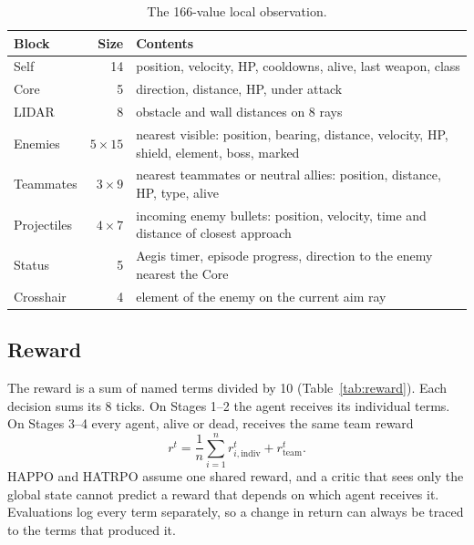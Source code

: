 \documentclass[11pt]{article}
\begin{document}
\begin{table}[t]
\centering
\caption{The 166-value local observation.}
\label{tab:obs}
\small
\begin{tabular}{@{}lrl@{}}
\toprule
Block & Size & Contents \\
\midrule
Self & 14 & position, velocity, HP, cooldowns, alive, last weapon, class \\
Core & 5 & direction, distance, HP, under attack \\
LIDAR & 8 & obstacle and wall distances on 8 rays \\
Enemies & $5 \times 15$ & nearest visible: position, bearing, distance, velocity, HP, shield, element, boss, marked \\
Teammates & $3 \times 9$ & nearest teammates or neutral allies: position, distance, HP, type, alive \\
Projectiles & $4 \times 7$ & incoming enemy bullets: position, velocity, time and distance of closest approach \\
Status & 5 & Aegis timer, episode progress, direction to the enemy nearest the Core \\
Crosshair & 4 & element of the enemy on the current aim ray \\
\bottomrule
\end{tabular}
\end{table}

\subsection{Reward}
\label{sec:reward}

The reward is a sum of named terms divided by 10 (Table~\ref{tab:reward}). Each decision sums its 8 ticks. On Stages 1--2 the agent receives its individual terms. On Stages 3--4 every agent, alive or dead, receives the same team reward
\begin{equation}
r^t = \frac{1}{n}\sum_{i=1}^{n} r^t_{i,\text{indiv}} + r^t_\text{team}.
\end{equation}
HAPPO and HATRPO assume one shared reward, and a critic that sees only the global state cannot predict a reward that depends on which agent receives it. Evaluations log every term separately, so a change in return can always be traced to the terms that produced it.
\end{document}
